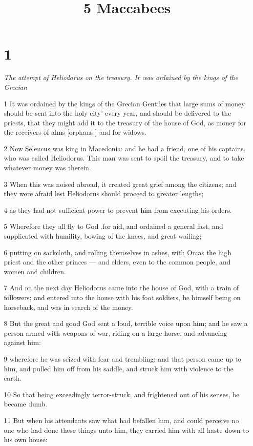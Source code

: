 

\title{5 Maccabees}


\chapter{1}

\par \textit {The attempt of Heliodorus on the treasury. Ir was ordained by the kings of the Grecian}

1 It was ordained by the kings of the Grecian Gentiles that large sums of money should be sent into the holy city’ every year, and should be delivered to the priests, that they might add it to the treasury of the house of God, as money for the receivers of alms [orphans ] and for widows. 

2 Now Seleucus was king in Macedonia: and he had a friend, one of his captains, who was called Heliodorus. This man was sent to spoil the treasury, and to take whatever money was therein. 

3 When this was noised abroad, it created great grief among the citizens; and they were afraid lest Heliodorus should proceed to greater lengths; 

4 as they had not sufficient power to prevent him from executing his orders. 

5 Wherefore they all fly to God ,for aid, and ordained a general fast, and supplicated with humility, bowing of the knees, and great wailing; 

6 putting on sackcloth, and rolling themselves in ashes, with Onias the high priest and the other princes — and elders, even to the common people, and women and children. 

7 And on the next day Heliodorus came into the house of God, with a train of followers; and entered into the house with his foot soldiers, he himself being on horseback, and was in search of the money. 

8 But the great and good God sent a loud, terrible voice upon him; and he saw a person armed with weapons of war, riding on a large horse, and advancing against him: 

9 wherefore he was seized with fear and trembling: and that person came up to him, and pulled him off from his saddle, and struck him with violence to the earth. 

10 So that being exceedingly terror-struck, and frightened out of his senses, he became dumb. 

11 But when his attendants saw what had befallen him, and could perceive no one who had done these things unto him, they carried him with all haste down to his own house: 

